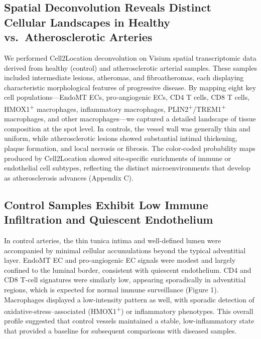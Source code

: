 \documentclass[a4paper,12pt]{article}
\begin{document}
\subsection{Spatial Deconvolution Reveals Distinct Cellular Landscapes in Healthy vs.\ Atherosclerotic Arteries}
We performed Cell2Location deconvolution on Visium spatial transcriptomic data derived from healthy (control) and atherosclerotic arterial samples. These samples included intermediate lesions, atheromas, and fibroatheromas, each displaying characteristic morphological features of progressive disease. By mapping eight key cell populations—EndoMT ECs, pro-angiogenic ECs, CD4 T cells, CD8 T cells, HMOX1\textsuperscript{+} macrophages, inflammatory macrophages, PLIN2\textsuperscript{+}/TREM1\textsuperscript{+} macrophages, and other macrophages—we captured a detailed landscape of tissue composition at the spot level. In controls, the vessel wall was generally thin and uniform, while atherosclerotic lesions showed substantial intimal thickening, plaque formation, and local necrosis or fibrosis. The color-coded probability maps produced by Cell2Location showed site-specific enrichments of immune or endothelial cell subtypes, reflecting the distinct microenvironments that develop as atherosclerosis advances (Appendix C).

\subsection{Control Samples Exhibit Low Immune Infiltration and Quiescent Endothelium}
In control arteries, the thin tunica intima and well-defined lumen were accompanied by minimal cellular accumulations beyond the typical adventitial layer. EndoMT EC and pro-angiogenic EC signals were modest and largely confined to the luminal border, consistent with quiescent endothelium. CD4 and CD8 T-cell signatures were similarly low, appearing sporadically in adventitial regions, which is expected for normal immune surveillance (Figure 1). Macrophages displayed a low-intensity pattern as well, with sporadic detection of oxidative-stress–associated (HMOX1\textsuperscript{+}) or inflammatory phenotypes. This overall profile suggested that control vessels maintained a stable, low-inflammatory state that provided a baseline for subsequent comparisons with diseased samples.
\end{document}
